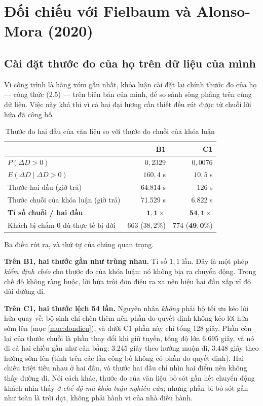 \section{Đối chiếu với Fielbaum và Alonso-Mora (2020)}
\label{muc:doichieu}

\subsection{Cài đặt thước đo của họ trên dữ liệu của mình}

Vì công trình \cite{fielbaum2020} là hàng xóm gần nhất, khóa luận cài đặt lại chính thước đo
của họ --- công thức (2.5) --- trên biên bản của mình, để so sánh sòng phẳng trên cùng dữ liệu.
Việc này khả thi vì cả hai đại lượng cần thiết đều rút được từ chuỗi lời hứa đã công bố.

\begin{table}[htbp]
\centering
\caption{Thước đo hai đầu của văn liệu so với thước đo chuỗi của khóa luận}
\label{bang:doichieu}
\small
\begin{tabular}{@{}lrr@{}}
\toprule
& \textbf{B1} & \textbf{C1}\\
\midrule
$P(\Delta D > 0)$ & $0{,}2329$ & $0{,}0076$\\
$E(\Delta D \mid \Delta D > 0)$ & $160{,}4$ s & $10{,}5$ s\\
Thước hai đầu (giờ trả) & 64.814 s & 126 s\\
Thước chuỗi của khóa luận (giờ trả) & 71.529 s & 6.822 s\\
\textbf{Tỉ số chuỗi / hai đầu} & $\mathbf{1{,}1\times}$ & $\mathbf{54{,}1\times}$\\
Khách bị chấm 0 dù thực tế bị dời & 663 ($38{,}2\%$) & 774 ($\mathbf{49{,}0\%}$)\\
\bottomrule
\end{tabular}
\end{table}

Ba điều rút ra, và thứ tự của chúng quan trọng.

\textbf{Trên B1, hai thước gần như trùng nhau.} Tỉ số $1{,}1$ lần. Đây là một phép \emph{kiểm
định chéo} cho thước đo của khóa luận: nó không bịa ra chuyển động. Trong chế độ không ràng buộc,
lời hứa trôi đơn điệu ra xa nên hiệu hai đầu xấp xỉ độ dài đường đi.

\textbf{Trên C1, hai thước lệch 54 lần.} Nguyên nhân \emph{không} phải bộ tối ưu kéo lời hứa quay
về: bộ sinh chỉ chèn thêm nên phần do quyết định không kéo lời hứa sớm lên (mục \ref{muc:dondieu}),
và dưới C1 phần này chỉ tổng $128$ giây. Phần còn lại của thước chuỗi là phần thay đổi khi giữ
tuyến, tổng độ lớn $6.695$ giây, và nó đi cả hai chiều gần như cân bằng: $3.245$ giây theo hướng
muộn đi, $3.448$ giây theo hướng sớm lên (tính trên các lần công bố không có phần do quyết định).
Hai chiều triệt tiêu nhau ở hai đầu, và thước hai đầu chỉ nhìn hai điểm nên không thấy đường đi.
Nói cách khác, thước đo của văn liệu bỏ sót gần hết chuyển động khách nhìn thấy \emph{ở chế độ mà
khóa luận nghiên cứu}; nhưng phần bị bỏ sót gần như toàn là trôi dạt, không phải hành vi của nhà
điều hành.


